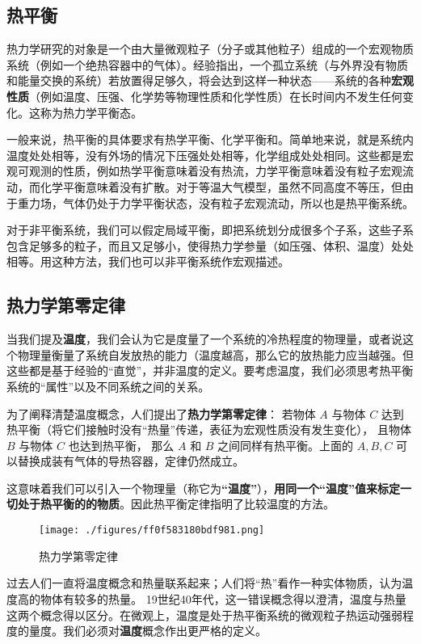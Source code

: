 
\begin{issues}
\issueDraft
\end{issues}

\subsection{热平衡}
热力学研究的对象是一个由大量微观粒子（分子或其他粒子）组成的一个宏观物质系统（例如一个绝热容器中的气体）。经验指出，一个孤立系统（与外界没有物质和能量交换的系统）若放置得足够久，将会达到这样一种状态——系统的各种\textbf{宏观性质}（例如温度、压强、化学势等物理性质和化学性质）在长时间内不发生任何变化。这称为热力学平衡态。

一般来说，热平衡的具体要求有热学平衡、化学平衡和。简单地来说，就是系统内温度处处相等，没有外场的情况下压强处处相等，化学组成处处相同。这些都是宏观可观测的性质，例如热学平衡意味着没有热流，力学平衡意味着没有粒子宏观流动，而化学平衡意味着没有扩散。对于等温大气模型，虽然不同高度不等压，但由于重力场，气体仍处于力学平衡状态，没有粒子宏观流动，所以也是热平衡系统。

对于非平衡系统，我们可以假定局域平衡，即把系统划分成很多个子系，这些子系包含足够多的粒子，而且又足够小，使得热力学参量（如压强、体积、温度）处处相等。用这种方法，我们也可以非平衡系统作宏观描述。

\subsection{热力学第零定律}
当我们提及\textbf{温度}，我们会认为它是度量了一个系统的冷热程度的物理量，或者说这个物理量衡量了系统自发放热的能力（温度越高，那么它的放热能力应当越强。但这些都是基于经验的“直觉”，并非温度的定义。要考虑温度，我们必须思考热平衡系统的“属性”以及不同系统之间的关系。

为了阐释清楚温度概念，人们提出了\textbf{热力学第零定律}：
若物体 $A$ 与物体 $C$ 达到热平衡（将它们接触时没有“热量”传递，表征为宏观性质没有发生变化）， 且物体 $B$ 与物体 $C$ 也达到热平衡， 那么 $A$ 和 $B$ 之间同样有热平衡。上面的 $A,B,C$ 可以替换成装有气体的导热容器，定律仍然成立。

这意味着我们可以引入一个物理量（称它为\textbf{“温度”}），\textbf{用同一个“温度”值来标定一切处于热平衡的的物质}。因此热平衡定律指明了比较温度的方法。
\begin{figure}[ht]
\centering
\texttt{[image: ./figures/ff0f583180bdf981.png]}
\caption{热力学第零定律} \label{fig_TherEq_1}
\end{figure}

过去人们一直将温度概念和热量联系起来；人们将“热”看作一种实体物质，认为温度高的物体有较多的热量。 19世纪40年代，这一错误概念得以澄清，温度与热量这两个概念得以区分。在微观上，温度是处于热平衡系统的微观粒子热运动强弱程度的量度。我们必须对\textbf{温度}概念作出更严格的定义。

